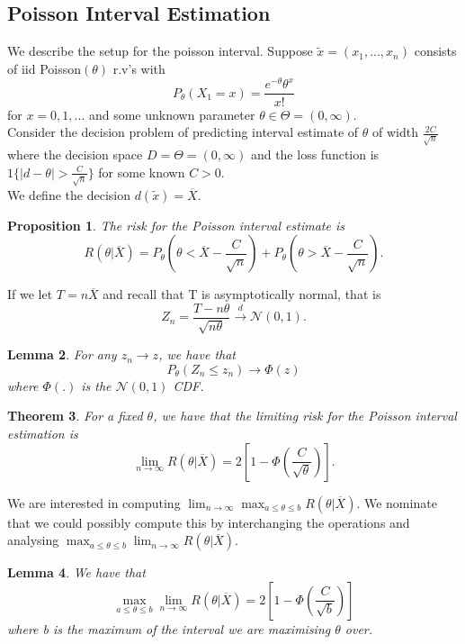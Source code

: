 \documentclass[twoside]{article}
\newcounter{lecnum}
\newtheorem{theorem}{Theorem}[lecnum]
\newtheorem{lemma}[theorem]{Lemma}
\newtheorem{proposition}[theorem]{Proposition}
\begin{document}
\subsection{Poisson Interval Estimation}
We describe the setup for the poisson interval. Suppose $\tilde{x} = (x_1,...,x_n)$ consists of iid Poisson$(\theta)$ r.v's with 
$$
P_{\theta}(X_1=x) = \frac{e^{-\theta}\theta^x}{x!}
$$
for $x = 0,1,...$ and some unknown parameter $\theta \in \Theta = (0,\infty).$\\
Consider the decision problem of predicting interval estimate of $\theta$ of width $\frac{2C}{\sqrt{n}}$ where the decision space $D = \Theta = (0,\infty)$ and the loss function is $1\{|d-\theta| > \frac{C}{\sqrt{n}}\}$ for some known $C > 0.$\\
We define the decision $d(\tilde{x}) = \overline{X}.$ 

\begin{proposition}The risk for the Poisson interval estimate is 
$$
R(\theta|\overline{X}) = P_{\theta}(\theta < \overline{X} - \frac{C}{\sqrt{n}}) + P_{\theta}(\theta > \overline{X} - \frac{C}{\sqrt{n}}).
$$
\end{proposition}

If we let $T = n\overline{X}$ and recall that T is asymptotically normal, that is 
$$
Z_n = \frac{T - n\theta}{\sqrt{n\theta}} \xrightarrow{d} \mathcal{N}(0,1).
$$

\begin{lemma}For any $z_n \rightarrow z$, we have that 
$$
P_{\theta}(Z_n \leq z_n) \rightarrow \Phi(z)
$$
where $\Phi(.)$ is the $\mathcal{N}(0,1)$ CDF.
\end{lemma}

\begin{theorem}For a fixed $\theta$, we have that the limiting risk for the Poisson interval estimation is 
$$
\lim_{n \rightarrow \infty}R(\theta|\overline{X}) = 2[1 - \Phi(\frac{C}{\sqrt{\theta}})].
$$
\end{theorem}

We are interested in computing $\lim_{n\rightarrow \infty}\max_{a \leq \theta \leq b}R(\theta|\overline{X})$. We nominate that we could possibly compute this by interchanging the operations and analysing $\max_{a \leq \theta \leq b}\lim_{n\rightarrow \infty}R(\theta|\overline{X}).$

\begin{lemma}We have that 
$$
\max_{a \leq \theta \leq b}\lim_{n\rightarrow \infty}R(\theta|\overline{X}) = 2[1 - \Phi(\frac{C}{\sqrt{b}})]
$$
where b is the maximum of the interval we are maximising $\theta$ over.
\end{lemma}
\end{document}
